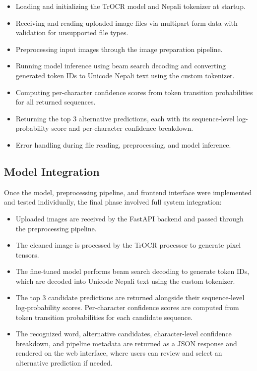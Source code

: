 \begin{itemize}
    \item Loading and initializing the TrOCR model and Nepali tokenizer at 
    startup.
    
    \item Receiving and reading uploaded image files via multipart form data 
    with validation for unsupported file types.
    
    \item Preprocessing input images through the image preparation pipeline.
    
    \item Running model inference using beam search decoding and converting 
    generated token IDs to Unicode Nepali text using the custom tokenizer.
    
    \item Computing per-character confidence scores from token transition 
    probabilities for all returned sequences.
    
    \item Returning the top 3 alternative predictions, each with its 
    sequence-level log-probability score and per-character confidence 
    breakdown.
    
    \item Error handling during file reading, preprocessing, and model 
    inference.
\end{itemize}

\subsection{Model Integration}
Once the model, preprocessing pipeline, and frontend interface were 
implemented and tested individually, the final phase involved full system 
integration:

\begin{itemize}
    \item Uploaded images are received by the FastAPI backend and passed 
    through the preprocessing pipeline.
    
    \item The cleaned image is processed by the TrOCR processor to generate 
    pixel tensors.
    
    \item The fine-tuned model performs beam search decoding to generate token IDs, which are decoded into Unicode Nepali text using the custom tokenizer.
    
    \item The top 3 candidate predictions are returned alongside their 
    sequence-level log-probability scores. Per-character confidence scores 
    are computed from token transition probabilities for each candidate 
    sequence.
    
    \item The recognized word, alternative candidates, character-level 
    confidence breakdown, and pipeline metadata are returned as a JSON 
    response and rendered on the web interface, where users can review and 
    select an alternative prediction if needed.
\end{itemize}


